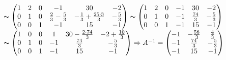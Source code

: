 \begin{figure*}
$\thicksim
\begin{pmatrix}
    1&2&0&-1&30&-2\\
    0&1&0&\frac{2}{3}-\frac{5}{3}&-\frac{1}{3}+\frac{25\cdot 3}{3}&-\frac{5}{3}\\
    0&0&1&-1&15&-1
\end{pmatrix}
\thicksim
\begin{pmatrix}
    1&2&0&-1&30&-2\\
    0&1&0&-1&\frac{74}{3}&-\frac{5}{3}\\
    0&0&1&-1&15&-1
\end{pmatrix}
$\\
$
\thicksim
\begin{pmatrix}
    1&0&0&1&30-\frac{2\cdot 74}{3}&-2+\frac{10}{3}\\
    0&1&0&-1&\frac{74}{3}&-\frac{5}{3}\\
    0&0&1&-1&15&-1
\end{pmatrix}
\Rightarrow
A^{-1}=
\begin{pmatrix}
    -1&-\frac{58}{3}&\frac{4}{3}\\
    -1&\frac{74}{3}&-\frac{5}{3}\\
    -1&15&-1
\end{pmatrix}$
\end{figure*}